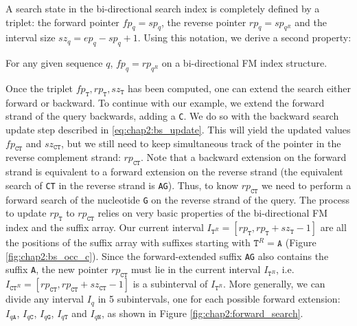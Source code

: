 A search state in the bi-directional search index is completely
defined by a triplet: the forward pointer $fp_q = sp_q$, the reverse
pointer $rp_q=sp_{q^R}$ and the interval size $sz_q =
ep_q-sp_q+1$. Using this notation, we derive a second property:

\begin{property}
  \label{property:chap2:interval_complement}
  For any given sequence $q$, $fp_q = rp_{q^R}$ on a bi-directional FM
  index structure.
\end{property}

Once the triplet $fp_{\texttt{T}}, rp_{\texttt{T}}, sz_{\texttt{T}}$
has been computed, one can extend the search either forward or
backward. To continue with our example, we extend the forward strand
of the query backwards, adding a \texttt{C}. We do so with the
backward search update step described in
\eqref{eq:chap2:bs_update}. This will yield the updated values
$fp_{\texttt{CT}}$ and $sz_{\texttt{CT}}$, but we still need to keep
simultaneous track of the pointer in the reverse complement strand:
$rp_{\texttt{CT}}$. Note that a backward extension on the
forward strand is equivalent to a forward extension on the reverse
strand (the equivalent search of \texttt{CT} in the reverse strand is
\texttt{AG}). Thus, to know $rp_{\texttt{CT}}$ we need to perform
a forward search of the nucleotide \texttt{G} on the reverse strand of
the query. The process to update $rp_{\texttt{T}}$ to
$rp_{\texttt{CT}}$ relies on very basic properties of the
bi-directional FM index and the suffix array. Our current interval
$I_{\texttt{T}^R}=[rp_{\texttt{T}}, rp_{\texttt{T}}+sz_{\texttt{T}}-1]$ are all the
positions of the suffix array with suffixes starting with
$\texttt{T}^R=\texttt{A}$ (Figure \ref{fig:chap2:bs_occ_c}). Since the
forward-extended suffix \texttt{AG} also contains the suffix
\texttt{A}, the new pointer $rp_{\texttt{CT}}$ must lie in the current
interval $I_{\texttt{T}^R}$, i.e. $I_{\texttt{CT}^R} =
[rp_{\texttt{CT}}, rp_{\texttt{CT}}+sz_{\texttt{CT}}-1]$ is a
subinterval of $I_{\texttt{T}^R}$. More generally, we can divide any
interval $I_q$ in 5 subintervals, one for each possible forward
extension: $I_{q\texttt{A}}$, $I_{q\texttt{C}}$, $I_{q\texttt{G}}$,
$I_{q\texttt{T}}$ and $I_{q\texttt{N}}$, as shown in Figure
\ref{fig:chap2:forward_search}.  
